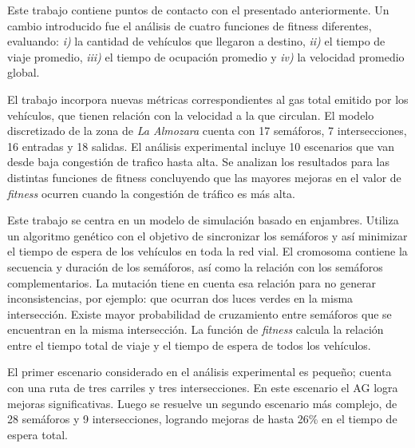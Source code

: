 \begin{itemize}
\begin{item}
\end{item}

\begin{item}

Este trabajo contiene puntos de contacto con el presentado anteriormente. Un cambio introducido fue el análisis de cuatro funciones de fitness diferentes, evaluando: \textit{i)} la cantidad de vehículos que llegaron a destino, \textit{ii)} el tiempo de viaje promedio, \textit{iii)} el tiempo de ocupación promedio y \textit{iv)} la velocidad promedio global. 

El trabajo incorpora nuevas métricas correspondientes al gas total emitido por los vehículos, que tienen relación con la velocidad a la que circulan. El modelo discretizado de la zona de \emph{La Almozara} cuenta con 17 semáforos, 7 intersecciones, 16 entradas y 18 salidas. El análisis experimental incluye 10 escenarios que van desde baja congestión de trafico hasta alta. Se analizan los resultados para las distintas funciones de fitness concluyendo que las mayores mejoras en el valor de \emph{fitness} ocurren cuando la congestión de tráfico es más alta.

\end{item}


\begin{item}

Este trabajo se centra en un modelo de simulación basado en enjambres. Utiliza un algoritmo genético con el objetivo de sincronizar los semáforos y así minimizar el tiempo de espera de los vehículos en toda la red vial. El cromosoma contiene la secuencia y duración de los semáforos, así como la relación con los semáforos complementarios. La mutación tiene en cuenta esa relación para no generar inconsistencias, por ejemplo: que ocurran dos luces verdes en la misma intersección. Existe mayor probabilidad de cruzamiento entre semáforos que se encuentran en la misma intersección. La función de \emph{fitness} calcula la relación entre el tiempo total de viaje y el tiempo de espera de todos los vehículos. 

El primer escenario considerado en el análisis experimental es pequeño; cuenta con una ruta de tres carriles y tres intersecciones. En este escenario el AG logra mejoras significativas. Luego se resuelve un segundo escenario más complejo, de 28 semáforos y 9 intersecciones, logrando mejoras de hasta 26\% en el tiempo de espera total.
\end{item}	



\end{itemize}
